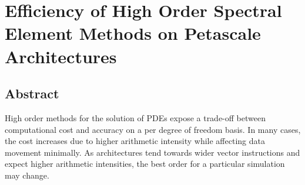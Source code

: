 \newcommand{\pluseq}{\mathrel{+}=}

\renewcommand{\ttdefault}{pcr}


\chapter{Efficiency of High Order Spectral Element Methods on Petascale Architectures}


%
%





\section{Abstract}
High order methods for the solution of PDEs expose a trade-off between computational cost and accuracy on a per degree of freedom basis.
In many cases, the cost increases due to higher arithmetic intensity while affecting data movement minimally.
As architectures tend towards wider vector instructions and expect higher arithmetic intensities, the best order for a particular simulation may change.

